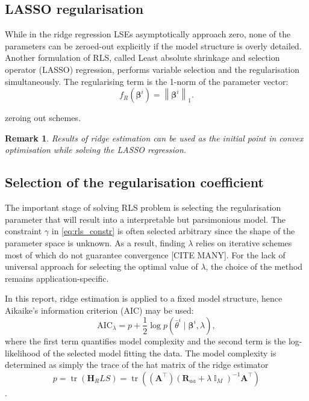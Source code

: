 \documentclass[a4paper,11pt,twoside]{article}
\newcommand{\norm}[1]{\left\lVert#1\right\rVert}
\DeclareMathOperator{\eye}{\mathbb{I}}
\DeclareMathOperator{\tr}{\textrm{tr}}
\theoremstyle{mytheoremstyle}
\newtheorem{remark}{Remark}[section]
\begin{document}
\subsection{LASSO regularisation}
\par While in the ridge regression LSEs asymptotically approach zero, none of the parameters can be zeroed-out explicitly if the model structure is overly detailed. Another formulation of RLS, called Least absolute shrinkage and selection operator (LASSO) regression, performs variable selection and the regularisation simultaneously. The regularising term is the 1-norm of the parameter vector:
\begin{equation}
f_{R}(\mathbf{\beta}^i) = \norm{\mathbf{\beta}^i}_{1}.
\end{equation}
\par zeroing out schemes.
\begin{remark}
	Results of ridge estimation can be used as the initial point in convex optimisation while solving the LASSO regression. 
\end{remark}
\subsection{Selection of the regularisation coefficient}
\par The important stage of solving RLS problem is selecting the regularisation parameter that will result into a interpretable but parsimonious model. The constraint $\gamma$ in \eqref{eq:rls_constr} is often selected arbitrary since the shape of the parameter space is unknown. As a result, finding $\lambda$ relies on iterative schemes most of which do not guarantee convergence [CITE MANY]. For the lack of universal approach for selecting the optimal value of $\lambda$, the choice of the method remains application-specific.
\par In this report, ridge estimation is applied to a fixed model structure, hence Aikaike’s information criterion (AIC) may be used:
\begin{equation}
\text{AIC}_{\lambda} = p + \frac{1}{2}\log p(\bar{\theta}^i \mid \mathbf{\beta}^i, \lambda),
\end{equation}
where the first term quantifies model complexity and the second term is the log-likelihood of the selected model fitting the data. The model complexity is determined as simply the trace of the hat matrix of the ridge estimator
\begin{equation}
p = \tr(\mathbf{H}_RLS) = \tr((\mathbf{A}^{\top})(\mathbf{R}_{aa} + \lambda \eye_M)^{-1} \mathbf{A}^{\top})
\end{equation}.
\end{document}

